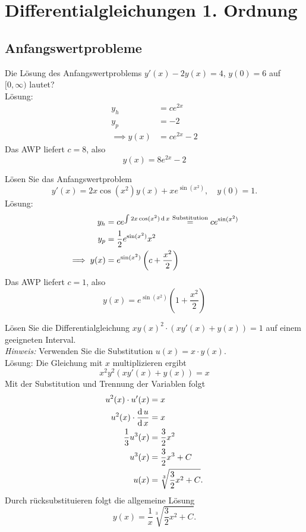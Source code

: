 \section{Differentialgleichungen 1. Ordnung}
\subsection{Anfangswertprobleme}
Die Lösung des Anfangswertproblems $y'(x) - 2y(x) = 4$, $y(0) = 6$ auf $[0,\infty)$ lautet?\\
Lösung:
\begin{align*}
  y_h &= c e^{2x}\\
  y_p &= -2\\
  \implies y(x) &= ce^{2x} - 2
\end{align*}
Das AWP liefert $c = 8$, also
\begin{displaymath}
  y(x) = 8e^{2x} - 2
\end{displaymath}

Lösen Sie das Anfangswertproblem 
\begin{displaymath}
  y'(x) = 2x \cos(x^2)y(x) + xe^{\sin(x^2)}, \quad y(0) = 1.
\end{displaymath}
Lösung:
\begin{align*}
  y_h &= ce^{\int 2x\cos(x^2) \operatorname{\mathop{}\!\mathrm{d}} x} \overset{\text{Substitution}}{=} ce^{\sin(x^2)}\\
  y_p &= \frac{1}{2} e^{\sin(x^2)} x^2\\
  \implies y(x) &= e^{\sin(x^2)} \left(c + \frac{x^2}{2}\right)
\end{align*}
Das AWP liefert $c = 1$, also
\begin{displaymath}
  y(x) = e^{\sin(x^2)} \left(1 + \frac{x^2}{2}\right)
\end{displaymath}

Lösen Sie die Differentialgleichung $xy(x)^2 \cdot (xy'(x) + y(x)) = 1$ auf einem geeigneten Interval.\\
\textit{Hinweis:}
Verwenden Sie die Substitution $u(x) = x \cdot y(x)$.\\
Lösung:
Die Gleichung mit $x$ multiplizieren ergibt
\begin{displaymath}
  x^2 y^2 (xy'(x) + y(x)) = x
\end{displaymath}
Mit der Substitution und Trennung der Variablen folgt
\begin{align*}
  u^2(x) \cdot u'(x) &= x\\
  u^2(x) \cdot \frac{\operatorname{\mathop{}\!\mathrm{d}} u}{\operatorname{\mathop{}\!\mathrm{d}} x} &= x\\
  \frac{1}{3} u^3(x)& = \frac{3}{2} x^2\\
  u^3(x) &= \frac{3}{2}x^3 + C\\
  u(x) &= \sqrt[3]{\frac{3}{2} x^2 + C}.
\end{align*}
Durch rücksubstituieren folgt die allgemeine Lösung
\begin{displaymath}
  y(x) = \frac{1}{x} \sqrt[3]{\frac{3}{2} x^2 + C}.
\end{displaymath}

